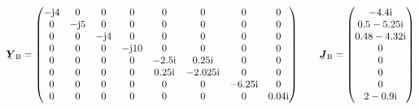 \begin{exemple}
    \[
       \mcmplx{Y}\ped{B} =
       \begin{pmatrix}
         -\ju 4 & 0 & 0 & 0 & 0 & 0 & 0 & 0 \\
         0 & -\ju 5 & 0 & 0 & 0 & 0 & 0 & 0 \\
         0 & 0 & -\ju 4 & 0 & 0 & 0 & 0 & 0 \\
         0 & 0 & 0 & -\ju 10 & 0 & 0 & 0 & 0 \\
         0 & 0 & 0 & 0 & \complexnum{-j 2,5} & \complexnum{j 0,25} & 0 & 0 \\
         0 & 0 & 0 & 0 & \complexnum{j 0,25} & \complexnum{-j 2,025} & 0 & 0 \\
         0 & 0 & 0 & 0 & 0 & 0 & \complexnum{-j 6,25} & 0 \\
         0 & 0 & 0 & 0 & 0 & 0 & 0 & \complexnum{j 0,04}
       \end{pmatrix}
       \qquad
       \mcmplx{J}\ped{B} =
       \begin{pmatrix}
        \complexnum{-j 4,4} \\
        \complexnum{0,5 - j 5,25} \\
        \complexnum{0,48 - j 4,32} \\
        0 \\
        0 \\
        0 \\
        0 \\
        \complexnum{2 - j 0,9}
       \end{pmatrix}
    \]


\end{exemple}
